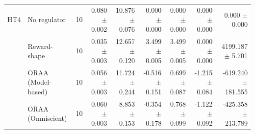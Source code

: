 \begin{tabular}{llrrrrrrr}
\addlinespace
HT4 & No regulator & 10 & 0.080 $\pm$ 0.002 & 10.876 $\pm$ 0.076 & 0.000 $\pm$ 0.000 & 0.000 $\pm$ 0.000 & 0.000 $\pm$ 0.000 & 0.000 $\pm$ 0.000 \\
 & Reward-shape & 10 & 0.035 $\pm$ 0.003 & 12.657 $\pm$ 0.120 & 3.499 $\pm$ 0.005 & 3.499 $\pm$ 0.005 & 0.000 $\pm$ 0.000 & 4199.187 $\pm$ 5.701 \\
 & ORAA (Model-based) & 10 & 0.056 $\pm$ 0.003 & 11.724 $\pm$ 0.244 & -0.516 $\pm$ 0.151 & 0.699 $\pm$ 0.087 & -1.215 $\pm$ 0.084 & -619.240 $\pm$ 181.555 \\
 & ORAA (Omniscient) & 10 & 0.060 $\pm$ 0.003 & 8.853 $\pm$ 0.153 & -0.354 $\pm$ 0.178 & 0.768 $\pm$ 0.099 & -1.122 $\pm$ 0.092 & -425.358 $\pm$ 213.789 \\
\bottomrule
\end{tabular}
